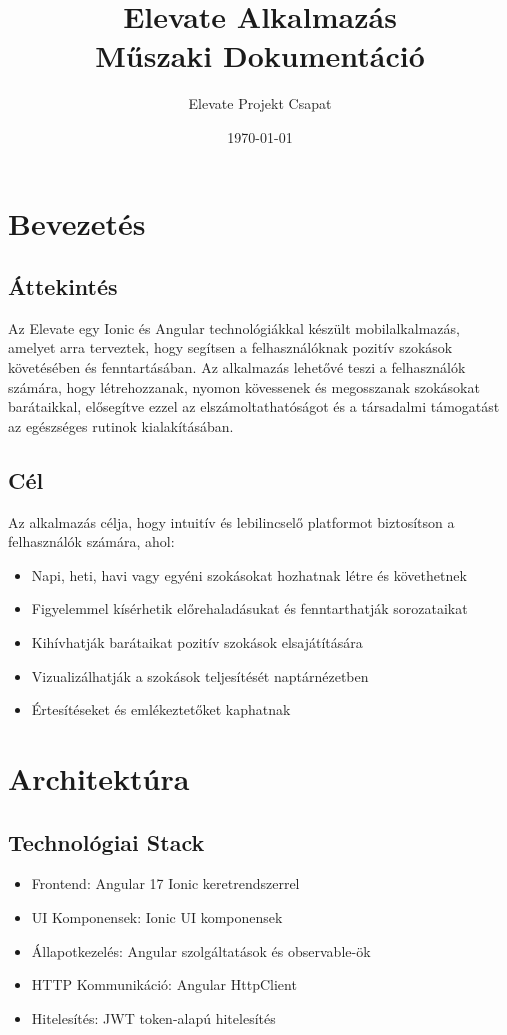 \documentclass[12pt,a4paper]{report}
\title{\Huge{\textbf{Elevate Alkalmazás}}\\\Large{Műszaki Dokumentáció}}
\author{Elevate Projekt Csapat}
\date{\today}
\begin{document}
\maketitle
\tableofcontents
\newpage

\chapter{Bevezetés}

\section{Áttekintés}
Az Elevate egy Ionic és Angular technológiákkal készült mobilalkalmazás, amelyet arra terveztek, hogy segítsen a felhasználóknak pozitív szokások követésében és fenntartásában. Az alkalmazás lehetővé teszi a felhasználók számára, hogy létrehozzanak, nyomon kövessenek és megosszanak szokásokat barátaikkal, elősegítve ezzel az elszámoltathatóságot és a társadalmi támogatást az egészséges rutinok kialakításában.

\section{Cél}
Az alkalmazás célja, hogy intuitív és lebilincselő platformot biztosítson a felhasználók számára, ahol:
\begin{itemize}
    \item Napi, heti, havi vagy egyéni szokásokat hozhatnak létre és követhetnek
    \item Figyelemmel kísérhetik előrehaladásukat és fenntarthatják sorozataikat
    \item Kihívhatják barátaikat pozitív szokások elsajátítására
    \item Vizualizálhatják a szokások teljesítését naptárnézetben
    \item Értesítéseket és emlékeztetőket kaphatnak
\end{itemize}

\chapter{Architektúra}

\section{Technológiai Stack}
\begin{itemize}
    \item Frontend: Angular 17 Ionic keretrendszerrel
    \item UI Komponensek: Ionic UI komponensek
    \item Állapotkezelés: Angular szolgáltatások és observable-ök
    \item HTTP Kommunikáció: Angular HttpClient
    \item Hitelesítés: JWT token-alapú hitelesítés
\end{itemize}
\end{document}
